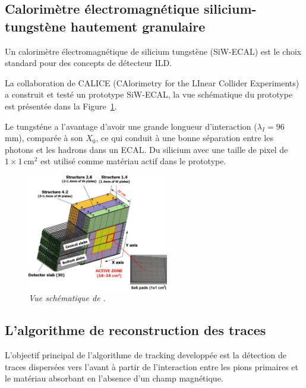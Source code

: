 \subsection*{Calorim\`etre \'electromagn\'etique silicium-tungst\`ene hautement granulaire}

Un calorim\`etre \'electromagn\'etique de silicium tungst\`ene (SiW-ECAL) est le
choix standard pour des concepts de d\'etecteur ILD.

La collaboration de CALICE (CAlorimetry for the LInear Collider Experiments) a construit et testé un prototype SiW-ECAL, la vue schématique du prototype est présentée dans la Figure~\ref {fig:ECAL-schemeF}.

Le tungst\'ene a l’avantage d’avoir une grande longueur d’interaction ($\lambda_I = 96$\,mm), compar\'ee \`a son $X_0$, ce
qui conduit \`a une bonne s\'eparation entre les photons et les hadrons dans un ECAL. 
Du silicium avec une taille de pixel de $1\times1$\,cm$^2$ est utilis\'e comme mat\'eriau actif dans le prototype. 
\begin{figure}
	\centering
	\includegraphics[width=0.55\textwidth]{ECAL/graphics/ecal-new.png}
	\caption{\label{fig:ECAL-schemeF} \sl  Vue sch\'ematique de \ecal.}
\end{figure}

\newpage
\subsection*{L'algorithme de reconstruction des traces}
L'objectif principal de l'algorithme de tracking developp\'ee est la détection de traces dispersées vers l'avant à partir de l'interaction entre les pions primaires et le matériau absorbant en l'absence d'un champ magnétique.

